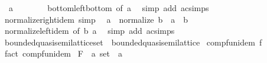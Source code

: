 \begin{isabellebody}
\ \ {\isachardoublequoteopen}a\ \isactrlbold {\isacharasterisk}{\kern0pt}\ \isactrlbold {\isasymbottom}\ {\isacharequal}{\kern0pt}\ \isactrlbold {\isasymbottom}{\isachardoublequoteclose}\isanewline
%
\isadelimproof
\ \ %
\endisadelimproof
%
\isatagproof
{}\isamarkupfalse%
\ bottom{\isacharunderscore}{\kern0pt}left{\isacharunderscore}{\kern0pt}bottom\ {\isacharbrackleft}{\kern0pt}of\ a{\isacharbrackright}{\kern0pt}\ \isamarkupfalse%
\ {\isacharparenleft}{\kern0pt}simp\ add{\isacharcolon}{\kern0pt}\ ac{\isacharunderscore}{\kern0pt}simps{\isacharparenright}{\kern0pt}%
\endisatagproof
{\isafoldproof}%
%
\isadelimproof
\isanewline
%
\endisadelimproof
\isanewline
{}\isamarkupfalse%
\ normalize{\isacharunderscore}{\kern0pt}right{\isacharunderscore}{\kern0pt}idem\ {\isacharbrackleft}{\kern0pt}simp{\isacharbrackright}{\kern0pt}{\isacharcolon}{\kern0pt}\isanewline
\ \ {\isachardoublequoteopen}a\ \isactrlbold {\isacharasterisk}{\kern0pt}\ normalize\ b\ {\isacharequal}{\kern0pt}\ a\ \isactrlbold {\isacharasterisk}{\kern0pt}\ b{\isachardoublequoteclose}\isanewline
%
\isadelimproof
\ \ %
\endisadelimproof
%
\isatagproof
{}\isamarkupfalse%
\ normalize{\isacharunderscore}{\kern0pt}left{\isacharunderscore}{\kern0pt}idem\ {\isacharbrackleft}{\kern0pt}of\ b\ a{\isacharbrackright}{\kern0pt}\ \isamarkupfalse%
\ {\isacharparenleft}{\kern0pt}simp\ add{\isacharcolon}{\kern0pt}\ ac{\isacharunderscore}{\kern0pt}simps{\isacharparenright}{\kern0pt}%
\endisatagproof
{\isafoldproof}%
%
\isadelimproof
\isanewline
%
\endisadelimproof
\isanewline
{}\isamarkupfalse%
\isanewline
\isanewline
{}\isamarkupfalse%
\ bounded{\isacharunderscore}{\kern0pt}quasi{\isacharunderscore}{\kern0pt}semilattice{\isacharunderscore}{\kern0pt}set\ {\isacharequal}{\kern0pt}\ bounded{\isacharunderscore}{\kern0pt}quasi{\isacharunderscore}{\kern0pt}semilattice\isanewline
{}\isanewline
\isanewline
{}\isamarkupfalse%
\ comp{\isacharunderscore}{\kern0pt}fun{\isacharunderscore}{\kern0pt}idem\ f\isanewline
%
\isadelimproof
\ \ %
\endisadelimproof
%
\isatagproof
{}\isamarkupfalse%
\ {\isacharparenleft}{\kern0pt}fact\ comp{\isacharunderscore}{\kern0pt}fun{\isacharunderscore}{\kern0pt}idem{\isacharparenright}{\kern0pt}%
\endisatagproof
{\isafoldproof}%
%
\isadelimproof
\isanewline
%
\endisadelimproof
\isanewline
{}\isamarkupfalse%
\ F\ {\isacharcolon}{\kern0pt}{\isacharcolon}{\kern0pt}\ {\isachardoublequoteopen}{\isacharprime}{\kern0pt}a\ set\ {\isasymRightarrow}\ {\isacharprime}{\kern0pt}a{\isachardoublequoteclose}\isanewline

\end{isabellebody}
